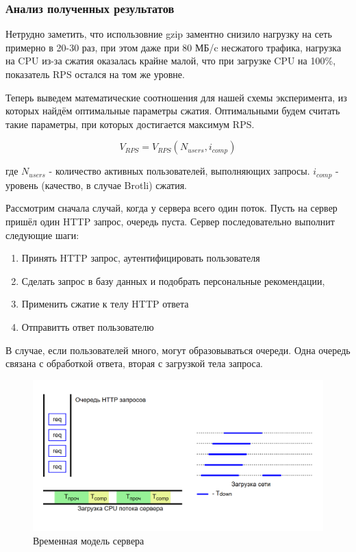 \documentclass[12pt]{article}
\begin{document}
\subsubsection{Анализ полученных результатов}

Нетрудно заметить, что использовние gzip заментно снизило нагрузку на сеть примерно в 20-30 раз,
при этом даже при 80 МБ/c несжатого трафика, нагрузка на CPU из-за сжатия оказалась крайне малой, что при загрузке CPU на 100\%,
показатель RPS остался на том же уровне.

Теперь выведем математические соотношения для нашей схемы эксперимента, из которых найдём оптимальные параметры сжатия.
Оптимальными будем считать такие параметры, при которых достигается максимум RPS.

\[
    V_{RPS} = V_{RPS}(N_{users}, i_{comp})
\]

где $N_{users}$ - количество активных пользователей, выполняющих запросы. $i_{comp}$ - уровень (качество, в случае Brotli) сжатия.

Рассмотрим сначала случай, когда у сервера всего один поток. Пусть на сервер пришёл один HTTP запрос, очередь пуста. Сервер последовательно выполнит следующие шаги:

\begin{enumerate}
    \item Принять HTTP запрос, аутентифицировать пользователя
    \item Сделать запрос в базу данных и подобрать персональные рекомендации,
    \item Применить сжатие к телу HTTP ответа
    \item Отправитть ответ пользователю
\end{enumerate}

В случае, если пользователей много, могут образовываться очереди. Одна очередь связана с обработкой ответа, вторая с загрузкой тела запроса.

\begin{figure}[H]
    \centering
    \includegraphics[width=1\textwidth]{../images/timing-model.png}
    \caption{Временная модель сервера}
\end{figure}
\end{document}

